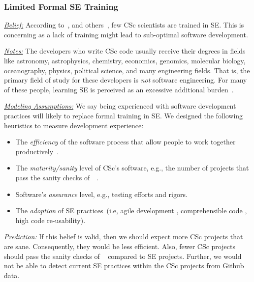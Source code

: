 \documentclass[conference,10pt]{IEEEtran}
\newcommand{\bi}{\begin{itemize}}
\newcommand{\ei}{\end{itemize}}
\begin{document}



\subsubsection{Limited Formal SE Training}\label{tion:training} 

\noindent \textit{\underline{Belief:}} According to~\citet{segal_enduser},
and others~\cite{basili08_hpc, carver13_perception, sanders08_risk}, few CSc scientists are trained in SE.\hspace{-2pt} This is concerning as a lack of training might lead to sub-optimal software
development.

\noindent \textit{\underline{Notes:}} 
The developers who write CSc code usually
receive their degrees in fields like
astronomy, astrophysics, chemistry, economics, genomics, molecular biology, oceanography, physics, political science, and many engineering fields.
That is, the primary field of study for these developers is {\em not}
software engineering. For many of these people,
learning SE is perceived as an excessive additional burden~\cite{boyle09_lessons}.

\noindent \textit{\underline{Modeling Assumptions:}} 
We say being experienced with software development practices will likely to replace formal training in SE. We designed the following heuristics to measure development experience:
\bi
\item The {\em efficiency} of the software process that allow  people to work together productively~\cite{Portela_17}. 
\item The {\em maturity/sanity} level of CSc's software, e.g., the number of projects that pass the sanity checks of~~\cite{Kalliamvakou:2014}.
\item Software's {\em assurance} level, e.g., testing efforts and rigors.
\item The {\em adoption} of SE practices~(i.e,\hspace{-2pt} agile development \cite{levy2009knowledge},\hspace{-2pt} comprehensible code \cite{von1995program},  high code re-usability\cite{code_reuse}).
\ei

\noindent \textit{\underline{Prediction:}} If this belief is valid, then we should expect more CSc projects that are sane. Consequently, they would be less efficient. Also, fewer CSc projects should pass the sanity checks of ~ compared to SE projects. Further, we would not be able to detect current SE practices within the CSc projects from Github data.
\end{document}
